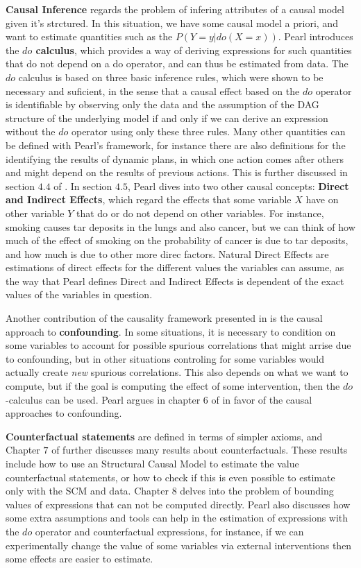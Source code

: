 \textbf{Causal Inference} regards the problem of infering attributes of a causal model given it's strctured. In this situation, we have some causal model a priori, and want to estimate quantities such as the $P(Y=y|do(X=x))$. Pearl introduces the \textbf{$do$ calculus}, which provides a way of deriving expressions for such quantities that do not depend on a do operator, and can thus be estimated from data. The $do$ calculus is based on three basic inference rules, which were shown to be necessary and suficient, in the sense that a causal effect based on the $do$ operator is identifiable by observing only the data and the assumption of the DAG structure of the underlying model if and only if we can derive an expression without the $do$ operator using only these three rules. Many other quantities can be defined with Pearl's framework, for instance there are also definitions for the identifying the results of dynamic plans, in which one action comes after others and might depend on the results of previous actions. This is further discussed in section $4.4$ of \cite{Causality}. In section $4.5$, Pearl dives into two other causal concepts: \textbf{Direct and Indirect Effects}, which regard the effects that some variable $X$ have on other variable $Y$ that do or do not depend on other variables. For instance, smoking causes tar deposits in the lungs and also cancer, but we can think of how much of the effect of smoking on the probability of cancer is due to tar deposits, and how much is due to other more direc factors. Natural Direct Effects are  estimations of direct effects for the different values the variables can assume, as the way that Pearl defines Direct and Indirect Effects is dependent of the exact values of the variables in question.

Another contribution of the causality framework presented in \cite{Causality} is the causal approach to \textbf{confounding}. In some situations, it is necessary to condition on some variables to account for possible spurious correlations that might arrise due to confounding, but in other situations controling for some variables would actually create \textit{new} spurious correlations. This also depends on what we want to compute, but if the goal is computing the effect of some intervention, then the $do$-calculus can be used. Pearl argues in chapter $6$ of \cite{Causality} in favor of the causal approaches to confounding.

\textbf{Counterfactual statements} are defined in terms of simpler axioms, and Chapter $7$ of \cite{Causality} further discusses many results about counterfactuals. These results include how to use an Structural Causal Model to estimate the value counterfactual statements, or how to check if this is even possible to estimate only with the SCM and data. Chapter $8$ delves into the problem of bounding values of expressions that can not be computed directly. Pearl also discusses how some extra assumptions and tools can help in the estimation of expressions with the $do$ operator and counterfactual expressions, for instance, if we can experimentally change the value of some variables via external interventions then some effects are easier to estimate.

